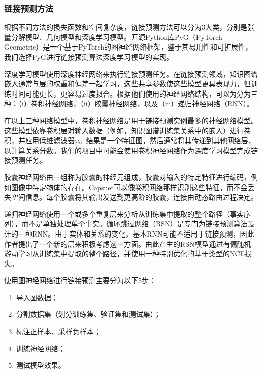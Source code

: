 \documentclass[twocolumn]{article}
\begin{document}
\subsubsection{链接预测方法}
根据不同方法的损失函数和空间复杂度，链接预测方法可以分为3大类，分别是张量分解模型、几何模型和深度学习模型\cite{link_prediction}。开源Python库PyG（PyTorch Geometric）是一个基于PyTorch的图神经网络框架，鉴于其易用性和可扩展性，我们选择PyG进行链接预测算法深度学习模型的实现。\par
深度学习模型使用深度神经网络来执行链接预测任务。在链接预测领域，知识图谱嵌入通常与层的权重和偏差一起学习，这些共享参数使这些模型更具表现力，但训练时间可能更长，更容易过度拟合。根据他们使用的神经网络结构，可以为分为三种：（i）卷积神经网络，（ii）胶囊神经网络，以及（iii）递归神经网络（RNN）\cite{link_prediction}。\par
在以上三种网络模型中，卷积神经网络是用于链接预测实例最多的神经网络模型。这些模型依靠卷积层对输入数据（例如，知识图谱训练集关系中的嵌入）进行卷积，并应用低维滤波器$\omega$。结果是一个特征图，然后通常将其传递到其他网络层，以计算关系分数。我们的项目中可能会使用卷积神经网络作为深度学习模型完成链接预测任务。\par
胶囊神经网络由一组称为胶囊的神经元组成，胶囊对输入的特定特征进行编码，例如图像中特定物体的存在。Capsnet可以像卷积网络那样识别这些特征，而不会丢失空间信息。每个胶囊将其输出发送到更高阶的胶囊，连接由动态路由过程决定。\par
递归神经网络使用一个或多个重复层来分析从训练集中提取的整个路径（事实序列），而不是单独处理单个事实。循环跳过网络（RSN）是专门为链接预测算法设计的一种RNN。由于实体和关系的变化，基本RNN可能不适用于链接预测，因此作者提出了一个新的层来积极考虑这一方面。由此产生的RSN模型通过有偏随机游动学习从训练集中提取的整个路径，并使用一种特别优化的基于类型的NCE损失。\par
使用图神经网络进行链接预测主要分为以下5步：\par
\begin{enumerate}
	\item 导入图数据；
	\item 分割数据集（划分训练集、验证集和测试集）；
	\item 标注正样本、采样负样本；
	\item 训练神经网络；
	\item 测试模型效果。
\end{enumerate}\par
\end{document}

